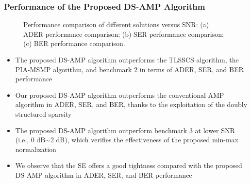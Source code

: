 \documentclass[9pt]{beamer}
\begin{document}
\begin{frame}
\frametitle{Performance of the Proposed DS-AMP Algorithm}
\begin{figure}[t]
\vspace{-8mm}
\centering
{}%
%
%
\centering
\setlength{\abovecaptionskip}{-1mm}
\caption{Performance comparison of different solutions versus SNR: (a) ADER performance comparison; (b) SER performance comparison; (c) BER performance comparison. }
\label{fig:SNR}
\vspace{-5mm}
\end{figure}
\begin{itemize}
\item
The proposed DS-AMP algorithm outperforms the TLSSCS algorithm, the PIA-MSMP algorithm, and benchmark 2 in terms of ADER, SER, and BER performance
\item
Our proposed DS-AMP algorithm outperforms the conventional AMP algorithm in ADER, SER, and BER, thanks to the exploitation of the doubly structured sparsity
\item
The proposed DS-AMP algorithm outperform benchmark 3 at lower SNR (i.e., 0 dB$\sim$2 dB), which verifies the effectiveness of the proposed min-max normalization
\item
We observe that the SE offers a good tightness compared with the proposed DS-AMP algorithm in ADER, SER, and BER performance
\end{itemize}
\end{frame}
\end{document}
